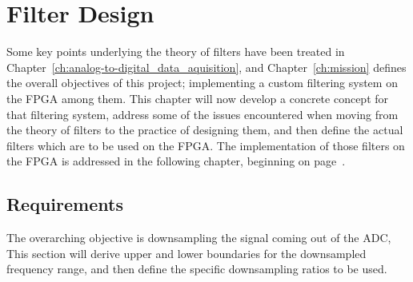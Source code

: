 \chapter{Filter Design} %
\label{ch:filter_design}

Some    key    points    underlying     the    theory    of    filters    have
been   treated   in  Chapter~\ref{ch:analog-to-digital_data_aquisition},   and
Chapter~\ref{ch:mission}  defines  the  overall objectives  of  this  project;
implementing a  custom filtering system  on the FPGA among  them. This chapter
will now develop a concrete concept for that filtering system, address some of
the issues encountered when moving from  the theory of filters to the practice
of designing them, and then define the  actual filters which are to be used on
the FPGA. The implementation of those filters  on the FPGA is addressed in the
following chapter, beginning on page~\pageref{ch:fpga}.


\section{Requirements} %
\label{sec:requirements}

The overarching  objective is downsampling the  signal coming out of  the ADC,
This  section will  derive  upper  and lower  boundaries  for the  downsampled
frequency range, and then define the specific downsampling ratios to be used.

